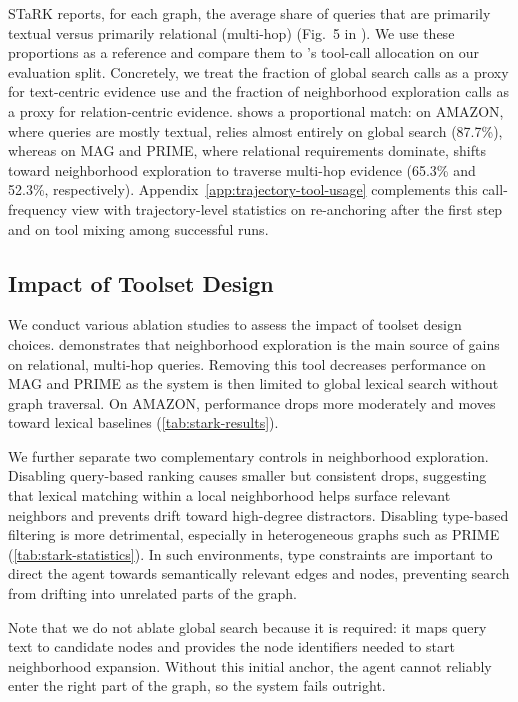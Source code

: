 STaRK reports, for each graph, the average share of queries that are primarily textual versus primarily relational (multi-hop) (Fig.~5 in \citet{wu_stark_2024}). We use these proportions as a reference and compare them to \retrieverShort's tool-call allocation on our evaluation split. Concretely, we treat the fraction of global search calls as a proxy for text-centric evidence use and the fraction of neighborhood exploration calls as a proxy for relation-centric evidence.  shows a proportional match: on AMAZON, where queries are mostly textual, \retrieverShort relies almost entirely on global search (87.7\%), whereas on MAG and PRIME, where relational requirements dominate, \retrieverShort shifts toward neighborhood exploration to traverse multi-hop evidence (65.3\% and 52.3\%, respectively). Appendix~\ref{app:trajectory-tool-usage} complements this call-frequency view with trajectory-level statistics on re-anchoring after the first step and on tool mixing among successful runs. 


\subsection{Impact of Toolset Design}
\label{sec:toolset}
\FigSFTImpact
\TabToolsetAblation[h]

We conduct various ablation studies to assess the impact of toolset design choices.  demonstrates that neighborhood exploration is the main source of gains on relational, multi-hop queries. Removing this tool decreases performance on MAG and PRIME as the system is then limited to global lexical search without graph traversal. On AMAZON, performance drops more moderately and moves toward lexical baselines (\cref{tab:stark-results}).


We further separate two complementary controls in neighborhood exploration. Disabling query-based ranking causes smaller but consistent drops, suggesting that lexical matching within a local neighborhood helps surface relevant neighbors and prevents drift toward high-degree distractors. Disabling type-based filtering is more detrimental, especially in heterogeneous graphs such as PRIME (\cref{tab:stark-statistics}). In such environments, type constraints are important to direct the agent towards semantically relevant edges and nodes, preventing search from drifting into unrelated parts of the graph.

Note that we do not ablate global search because it is required: it maps query text to candidate nodes and provides the node identifiers needed to start neighborhood expansion. Without this initial anchor, the agent cannot reliably enter the right part of the graph, so the system fails outright.

